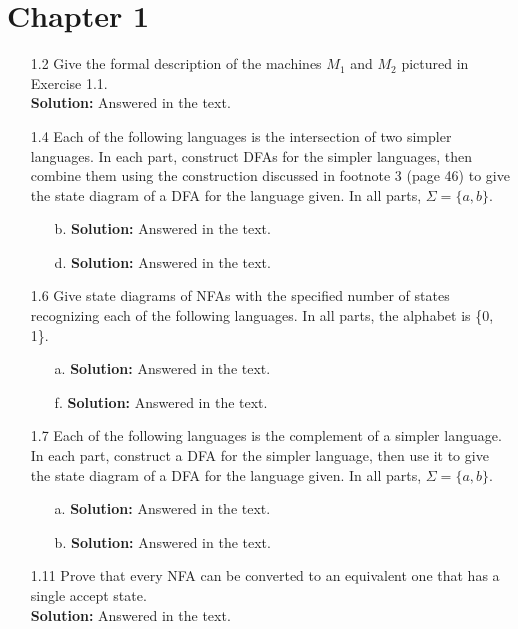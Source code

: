 \section{Chapter 1}

\begin{enumerate}

\item[1.2]Give the formal description of the machines $M_1$ and $M_2$ pictured in Exercise 1.1.
\\
\textbf{Solution:} Answered in the text.

\item[1.4]Each of the following languages is the intersection of two simpler languages. In each part, construct DFAs for the simpler languages, then combine them using the construction discussed in footnote 3 (page 46) to give the state diagram of a DFA for the language given. In all parts, $\Sigma = \{a, b\}$.
\begin{enumerate}
\item[b.]\textbf{Solution:} Answered in the text.
\item[d.]\textbf{Solution:} Answered in the text.
\end{enumerate}

\item[1.6]Give state diagrams of NFAs with the specified number of states recognizing each of the following languages. In all parts, the alphabet is \{0, 1\}.
\begin{enumerate}
\item[a.]\textbf{Solution:} Answered in the text.
\item[f.]\textbf{Solution:} Answered in the text.
\end{enumerate}

\item[1.7]Each of the following languages is the complement of a simpler language. In each part, construct a DFA for the simpler language, then use it to give the state diagram of a DFA for the language given. In all parts, $\Sigma = \{a, b\}$.
\begin{enumerate}
\item[a.]\textbf{Solution:} Answered in the text.
\item[b.]\textbf{Solution:} Answered in the text.
\end{enumerate}

\item[1.11]Prove that every NFA can be converted to an equivalent one that has a single accept state.
\\
\textbf{Solution:} Answered in the text.


\end{enumerate}
